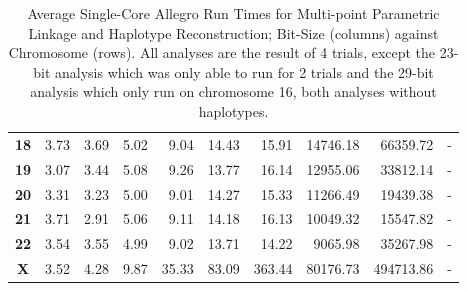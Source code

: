 \begin{table}[h]
\begin{center}
\begin{tabular}{crrrrrrrrr}
\textbf{18}                        & 3.73                           & 3.69                           & 5.02                           & 9.04                           & 14.43                           & 15.91                           & 14746.18                        & 66359.72                         & -                                \\
\textbf{19}                        & 3.07                           & 3.44                           & 5.08                           & 9.26                           & 13.77                           & 16.14                           & 12955.06                        & 33812.14                         & -                                \\
\textbf{20}                        & 3.31                           & 3.23                           & 5.00                           & 9.01                           & 14.27                           & 15.33                           & 11266.49                        & 19439.38                         & -                                \\
\textbf{21}                        & 3.71                           & 2.91                           & 5.06                           & 9.11                           & 14.18                           & 16.13                           & 10049.32                        & 15547.82                         & -                                \\
\textbf{22}                        & 3.54                           & 3.55                           & 4.99                           & 9.02                             & 13.71                           & 14.22                           & 9065.98                         & 35267.98                         & -                                \\
\textbf{X}                         & 3.52                           & 4.28                            & 9.87                           & 35.33                          & 83.09                           & 363.44                          & 80176.73                        & 494713.86                        & -                               \\
\hline
\end{tabular}
\end{center}
\vspace{-15pt}
\caption[Average Single-Core Allegro Run Times for MPT and Haplotype Reconstruction]{Average Single-Core Allegro Run Times for Multi-point Parametric Linkage and Haplotype Reconstruction; Bit-Size (columns) against Chromosome (rows). All analyses are the result of 4 trials, except the 23-bit analysis which was only able to run for 2 trials and the 29-bit analysis which only run on chromosome 16, both analyses without haplotypes.}\label{table:res:allegrosinglechroms}
\end{table}


